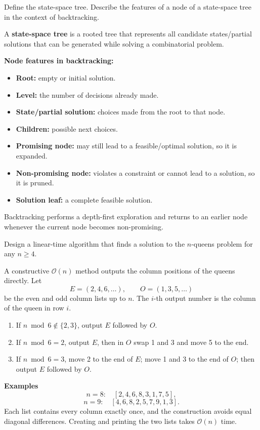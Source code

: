 \documentclass[11pt,a4paper]{article}
\newcommand{\Oh}{\mathcal{O}}
\begin{document}
\begin{qaquestion}
Define the state-space tree. Describe the features of a node of a state-space tree in the context of backtracking.
\end{qaquestion}
\begin{qaanswer}[Answer 2(a)]
A \textbf{state-space tree} is a rooted tree that represents all candidate states/partial solutions that can be generated while solving a combinatorial problem.

\textbf{Node features in backtracking:}
\begin{itemize}[leftmargin=*]
\item \textbf{Root:} empty or initial solution.
\item \textbf{Level:} the number of decisions already made.
\item \textbf{State/partial solution:} choices made from the root to that node.
\item \textbf{Children:} possible next choices.
\item \textbf{Promising node:} may still lead to a feasible/optimal solution, so it is expanded.
\item \textbf{Non-promising node:} violates a constraint or cannot lead to a solution, so it is pruned.
\item \textbf{Solution leaf:} a complete feasible solution.
\end{itemize}
Backtracking performs a depth-first exploration and returns to an earlier node whenever the current node becomes non-promising.
\end{qaanswer}

\begin{qaquestion}
Design a linear-time algorithm that finds a solution to the \(n\)-queens problem for any \(n\ge4\).
\end{qaquestion}
\begin{qaanswer}[Answer 2(b)]
A constructive \(\Oh(n)\) method outputs the column positions of the queens directly. Let
\[
E=(2,4,6,\ldots),\qquad O=(1,3,5,\ldots)
\]
be the even and odd column lists up to \(n\). The \(i\)-th output number is the column of the queen in row \(i\).

\begin{enumerate}[leftmargin=*]
\item If \(n\bmod 6\notin\{2,3\}\), output \(E\) followed by \(O\).
\item If \(n\bmod6=2\), output \(E\), then in \(O\) swap 1 and 3 and move 5 to the end.
\item If \(n\bmod6=3\), move 2 to the end of \(E\); move 1 and 3 to the end of \(O\); then output \(E\) followed by \(O\).
\end{enumerate}

\textbf{Examples}
\[
n=8:\quad [2,4,6,8,3,1,7,5],
\]
\[
n=9:\quad [4,6,8,2,5,7,9,1,3].
\]
Each list contains every column exactly once, and the construction avoids equal diagonal differences. Creating and printing the two lists takes \(\boxed{\Oh(n)}\) time.
\end{qaanswer}
\end{document}
